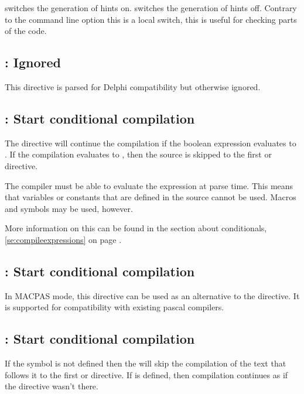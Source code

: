  switches the generation of hints on.
 switches the generation of hints off.
Contrary to the command line option  this is a local switch,
this is useful for checking parts of the code.

\subsection{: Ignored}
This directive is parsed for Delphi compatibility but otherwise ignored.

\subsection{ : Start conditional compilation}

The directive  will continue the compilation
if the boolean expression  evaluates to . If the
compilation evaluates to , then the source is skipped to the first
 or  directive.

The compiler must be able to evaluate the expression at parse time.
This means that variables or constants that are defined in
the source cannot be used. Macros and symbols may be used, however.

More information on this can be found in the section about
conditionals, \ref{se:compileexpressions} on page \pageref{se:compileexpressions}.

\subsection{ : Start conditional compilation}
In MACPAS mode, this directive can be used as an alternative to the 
directive. It is supported for compatibility with existing \macos pascal
compilers.

\subsection{ : Start conditional compilation}

If the symbol  is not defined then the 
will skip the compilation of the text that follows it to the first
 or  directive.
If  is defined, then compilation continues as if the directive
wasn't there.

